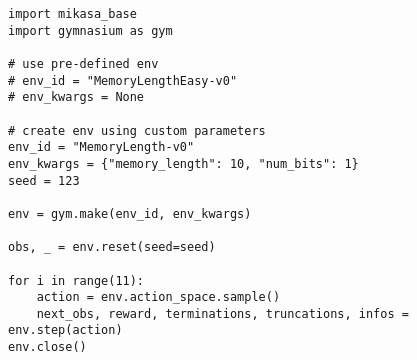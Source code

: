 \begin{lstlisting}[caption={Example code for running \texttt{MemoryLength-v0} environment.}, label={lst:memory}]
import mikasa_base
import gymnasium as gym

# use pre-defined env
# env_id = "MemoryLengthEasy-v0"
# env_kwargs = None

# create env using custom parameters 
env_id = "MemoryLength-v0"
env_kwargs = {"memory_length": 10, "num_bits": 1}
seed = 123

env = gym.make(env_id, env_kwargs)

obs, _ = env.reset(seed=seed)

for i in range(11):
    action = env.action_space.sample()
    next_obs, reward, terminations, truncations, infos = env.step(action)
env.close()
\end{lstlisting}








